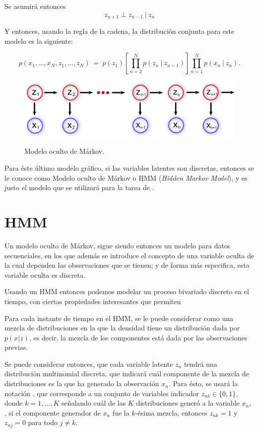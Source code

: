 Se asumirá entonces 
\begin{equation}
\label{eqn:3-6}
z_{n+1} \perp z_{n-1} ~|~ z_{n}
\end{equation}

Y entonces, usando la regla de la cadena, la distribución conjunta para este modelo
es la siguiente: 

\begin{equation}
\label{eqn:3-7}
p(x_1, ..., x_N, z_1, ..., z_N) ~=~ p(z_1) \left [ \prod_{n=2}^N p(z_n ~|~ z_{n-1}) \right ] 
\prod_{n=1}^N p(x_n ~|~ z_{n}).
\end{equation}

\begin{figure}[hbt]
        \myfloatalign
        {\includegraphics[width=0.8\linewidth]{gfx/3-mod-hmm}}
        \caption{Modelo oculto de Márkov.}
        \label{fig:mod_hmm1}
\end{figure}

Para éste último modelo gráfico, si las variables latentes son discretas, entonces se le 
conoce como Modelo oculto de Márkov o HMM (\textit{Hidden Markov Model}), y es justo el 
modelo que se utilizará para la tarea de \sd.

\section{HMM}

Un modelo oculto de Márkov, sigue siendo entonces un modelo para datos secuenciales, en 
los que además se introduce el concepto de una variable oculta de la cual dependen las 
observaciones que se tienen; y de forma más especifica, esta variable oculta es discreta. 

Usando un HMM entonces podemos modelar un proceso bivariado discreto en el tiempo, con ciertas 
propiedades interesantes que permiten 

Para cada instante de tiempo en el HMM, se le puede considerar como una mezcla de distribuciones
en la que la densidad tiene un distribución dada por $p(x|z)$, es decir, la mezcla de los 
componentes está dada por las observaciones previas.

Se puede considerar entonces, que cada variable latente $z_n$ tendrá una distribución 
multinomial discreta, que indicará cuál componente de la mezcla de distribuciones es la 
que ha generado la observación $x_n$. Para ésto, se usará la notación \unk, que corresponde 
a un conjunto de variables indicador $z_{nk} \in \lbrace 0, 1 \rbrace$, donde $k = 1, ..., K$ 
señalando cuál de las $K$ distribuciones generó a la variable $x_n$, \ie, si el componente 
generador de $x_n$ fue la $k$-ésima mezcla, entonces $z_{nk} = 1$ y $z_{nj} = 0$ para todo 
$j \neq k$.

